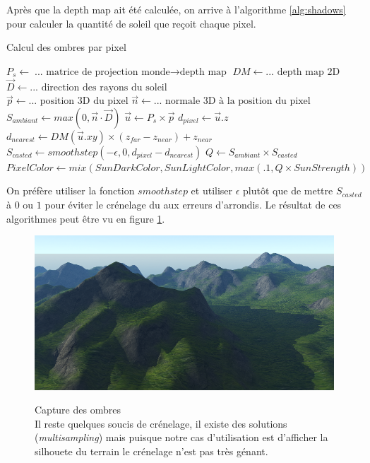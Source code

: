 \documentclass{EPUProjetDi}
\begin{document}
Après que la depth map ait été calculée, on arrive à l'algorithme \ref{alg:shadows} pour calculer la quantité de soleil que reçoit chaque pixel.
\begin{algorithm}
\caption{Calcul des ombres par pixel}
\label{alg:shadows}
\begin{algorithmic}
\State $P_s \gets \text{... matrice de projection monde$\rightarrow$depth map}$
\State $DM \gets \text{... depth map 2D}$
\State $\vec{D} \gets \text{... direction des rayons du soleil}$
\\
\State $\vec{p} \gets \text{...  position 3D du pixel}$
\State $\vec{n} \gets \text{... normale 3D à la position du pixel}$
\\
\State $S_{ambiant} \gets max(0, \vec{n}\cdot \vec{D})$
\State $\vec{u} \gets P_s\times\vec{p}$
\State $d_{pixel} \gets \vec{u}.z$
\State $d_{nearest} \gets DM(\vec{u}.xy)\times(z_{far}-z_{near})+z_{near}$
\State $S_{casted} \gets smoothstep(-\epsilon, 0, d_{pixel}-d_{nearest})$
\State $Q \gets S_{ambiant}\times S_{casted}$
\\
\State $PixelColor\gets mix(SunDarkColor, SunLightColor, max(.1, Q\times SunStrength))$
\end{algorithmic}
\end{algorithm}

On préfère utiliser la fonction $smoothstep$ et utiliser $\epsilon$ plutôt que de mettre $S_{casted}$ à $0$ ou $1$ pour éviter le crénelage du aux erreurs d'arrondis. Le résultat de ces algorithmes peut être vu en figure \ref{fig:shadows}.

\begin{figure}
	\centering
	\caption[Capture des ombres]{Capture des ombres\\Il reste quelques soucis de crénelage, il existe des solutions (\textit{multisampling}) mais puisque notre cas d'utilisation est d'afficher la silhouete du terrain le crénelage n'est pas très génant.}
	\includegraphics[scale=.45]{shadows}
	\label{fig:shadows}
	\vspace{-10pt}
\end{figure}
\end{document}
